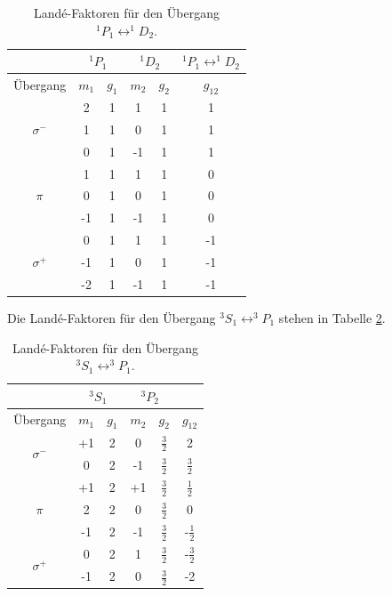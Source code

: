 \begin{table}
	\centering
  \caption{Landé-Faktoren für den Übergang $^1P_1 \leftrightarrow ^1\!\!D_2$.}
	\label{tab:Lande_rot}
	\begin{tabular}{cccccc}
		\toprule
		{} & \multicolumn{2}{c}{${}^1P_1$}  & \multicolumn{2}{c}{${}^1D_2$}  & $^1P_1 \leftrightarrow ^1\!\!D_2$ \\
		\midrule
		 Übergang &   $m_1$  & $g_{1}$ & $m_2$ & $ g_2$  & $g_{12}$  \\
		\midrule
		& 2 & 1 & 1 & 1 & 1\\
		$\sigma^-$ & 1 & 1 & 0 & 1 & 1\\
		& 0 & 1 & -1 & 1 & 1\\
		\midrule
		& 1 & 1 & 1 & 1 & 0\\
		$\pi$ & 0 & 1 & 0 & 1 & 0\\
		& -1 & 1 & -1 & 1 & 0\\
		\midrule
		& 0 & 1 & 1 & 1 & -1\\
		$\sigma^+$ & -1 & 1 & 0 & 1 & -1\\
		& -2 & 1 & -1 & 1 & -1\\\bottomrule
	\end{tabular}
  \end{table}
  Die Landé-Faktoren für den Übergang $^3S_1\leftrightarrow ^3\!\!P_1$ stehen in Tabelle \ref{tab:Lande_blau}.

  \begin{table}
  \caption{Landé-Faktoren für den Übergang $^3S_1\leftrightarrow ^3\!\!P_1$.} %
	\label{tab:Lande_blau}
	\centering
  \renewcommand{\arraystretch}{1.2}
  \begin{tabular}{cccccc}
		\toprule
    & \multicolumn{2}{c}{${}^3S_1$}  & \multicolumn{2}{c}{${}^3P_2$} \\
		\midrule
    Übergang & $m_1$  & $g_{1}$ & $m_2$ & $ g_2$ & $g_{12}$\\
		\midrule
		\multirow{2}{*}{$\sigma^-$} & +1 & 2 & 0 & $\frac{3}{2}$& 2\\
		& 0 & 2 & -1 & $\frac{3}{2}$ & $\frac{3}{2}$\\
		\midrule
		& +1 & 2 & +1 & $\frac{3}{2}$ & $\frac{1}{2}$\\
		$\pi$ & 2 & 2 & 0 & $\frac{3}{2}$ & 0 \\
		& -1 & 2 & -1 & $\frac{3}{2}$ & -$\frac{1}{2}$\\
		\midrule
		\multirow{2}{*}{$\sigma^+$} & 0 & 2 & 1 & $\frac{3}{2}$ & -$\frac{3}{2}$\\
		& -1 & 2 & 0 & $\frac{3}{2}$& -2\\
		\bottomrule
	\end{tabular}
\end{table}
\FloatBarrier

